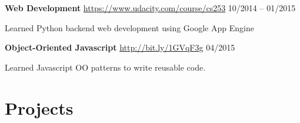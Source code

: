 \documentclass[margin,line]{resume}
\begin{document}
\begin{resume}
    \textbf{Web Development} \url{https://www.udacity.com/course/cs253} \hfill 10/2014 -- 01/2015 \vspace{-3mm}\\\vspace{-1mm}%
      \begin{list2}
       \item Learned Python backend web development using Google App Engine
      \end{list2}
    \vspace{-2mm}
    \textbf{Object-Oriented Javascript} \url{http://bit.ly/1GVqF3g} \hfill 04/2015 \vspace{-3mm}\\\vspace{-1mm}%
      \begin{list2}
       \item Learned Javascript OO patterns to write reusable code.
      \end{list2}
    \vspace{-2mm}

    \section{\myheadingstyle Projects}


\end{resume}
\end{document}

